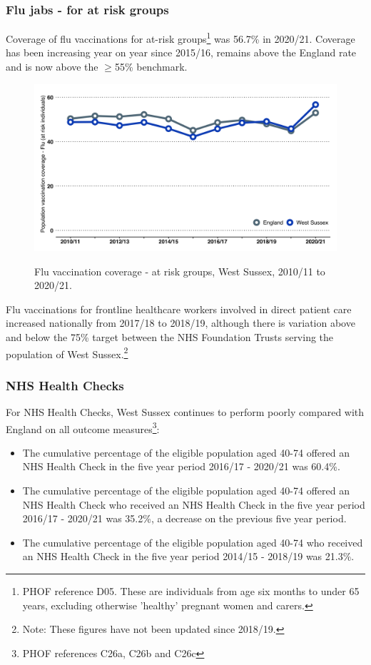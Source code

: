 \subsubsection{Flu jabs - for at risk groups} Coverage of flu vaccinations for at-risk groups\footnote{PHOF reference D05. These are individuals from age six months to under 65 years, excluding otherwise 'healthy' pregnant women and carers.} was 56.7\% in 2020/21. Coverage has been increasing year on year since 2015/16, remains above the England rate and is now above the $\geq$55\% benchmark.

\begin{figure}[htp]
    \caption{Flu vaccination coverage - at risk groups, West Sussex, 2010/11 to 2020/21.}
    \centering
    \includegraphics[width=\linewidth]{images/flu_vax_at_risk_popn.png}
    \label{fig:flu_vax_at_risk_coverage}
\end{figure}

Flu vaccinations for frontline healthcare workers involved in direct patient care increased nationally from 2017/18 to 2018/19, although there is variation above and below the 75\% target between the NHS Foundation Trusts serving the population of West Sussex.\footnote{Note: These figures have not been updated since 2018/19.}

\subsubsection{NHS Health Checks} For NHS Health Checks, West Sussex continues to perform poorly compared with England on all outcome measures\footnote{PHOF references C26a, C26b and C26c}:

\begin{itemize}[noitemsep]
    \item The cumulative percentage of the eligible population aged 40-74 offered an NHS Health Check in the five year period 2016/17 - 2020/21 was 60.4\%.
    \item The cumulative percentage of the eligible population aged 40-74 offered an NHS Health Check who received an NHS Health Check in the five year period 2016/17 - 2020/21 was 35.2\%, a decrease on the previous five year period.
    \item The cumulative percentage of the eligible population aged 40-74 who received an NHS Health Check in the five year period 2014/15 - 2018/19 was 21.3\%.
\end{itemize}


